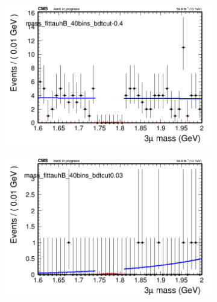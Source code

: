 \begin{figure}[H]
\begin{subfigure}{0.2\textwidth}
        \caption{}
    \end{subfigure}
    \begin{subfigure}{0.2\textwidth}
        \includegraphics[width=\textwidth]{power_law/plots/tauhB/massfit_tauhB_40bins_bdtcut-0.4.png}
        \caption{}
    \end{subfigure}
    \begin{subfigure}{0.2\textwidth}
        \includegraphics[width=\textwidth]{power_law/plots/tauhB/massfit_tauhB_40bins_bdtcut0.03.png}
        \caption{}
    \end{subfigure}
    \begin{subfigure}{0.2\textwidth}

\end{subfigure}
\end{figure}
